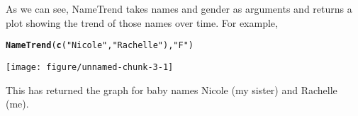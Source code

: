 \documentclass[12pt]{book}\usepackage[]{graphicx}\usepackage[]{color}
\makeatletter
\def\maxwidth{ %
  \ifdim\Gin@nat@width>\linewidth
    \linewidth
  \else
    \Gin@nat@width
  \fi
}
\newcommand{\hlstr}[1]{\textcolor[rgb]{0.192,0.494,0.8}{#1}}%
\newcommand{\hlstd}[1]{\textcolor[rgb]{0.345,0.345,0.345}{#1}}%
\newcommand{\hlkwd}[1]{\textcolor[rgb]{0.737,0.353,0.396}{\textbf{#1}}}%
\newenvironment{kframe}{%
 \def\at@end@of@kframe{}%
 \ifinner\ifhmode%
  \def\at@end@of@kframe{\end{minipage}}%
  \begin{minipage}{\columnwidth}%
 \fi\fi%
 \def\FrameCommand##1{\hskip\@totalleftmargin \hskip-\fboxsep
 \colorbox{shadecolor}{##1}\hskip-\fboxsep
     \hskip-\linewidth \hskip-\@totalleftmargin \hskip\columnwidth}%
 \MakeFramed {\advance\hsize-\width
   \@totalleftmargin\z@ \linewidth\hsize
   \@setminipage}}%
 {\par\unskip\endMakeFramed%
 \at@end@of@kframe}
\newenvironment{knitrout}{}{} %
\makeatother
\begin{document}
\noindent As we can see, NameTrend takes names and gender as arguments and returns a plot showing the trend of those names over time. For example,

\begin{knitrout}
\color{fgcolor}\begin{kframe}
\begin{alltt}
\hlkwd{NameTrend}\hlstd{(}\hlkwd{c}\hlstd{(}\hlstr{"Nicole"}\hlstd{,} \hlstr{"Rachelle"}\hlstd{),} \hlstr{"F"}\hlstd{)}
\end{alltt}
\end{kframe}
\texttt{[image: figure/unnamed-chunk-3-1]} 

\end{knitrout}


This has returned the graph for baby names Nicole (my sister) and Rachelle (me).
\end{document}
